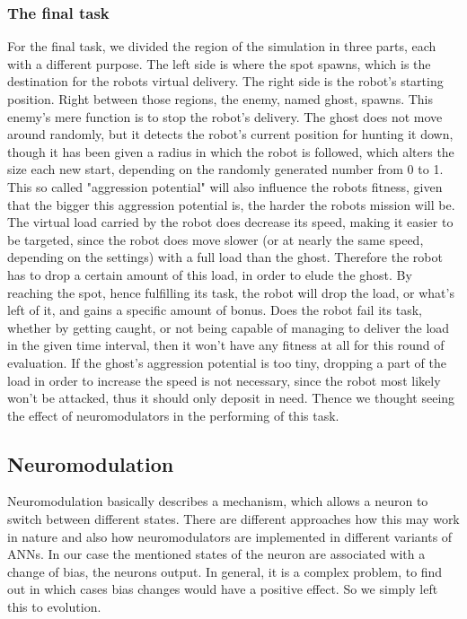 \documentclass[12pt,fleqn,a4paper]{article}
\begin{document}
\subsubsection{The final task}
For the final task, we divided the region of the simulation in three parts, each with a different purpose. The left side is where the spot spawns, which is the destination for the robots virtual delivery. The right side is the robot's 
starting position. Right between those regions, the enemy, named ghost, spawns. This enemy's mere function is to stop the robot's delivery. The ghost does not move around randomly, but it detects the robot's current position for hunting it down, though it has been given a radius in which the robot is followed, which alters the size each new start, depending on the randomly generated number from 0 to 1. This so called "aggression potential" will also influence the robots fitness, given that the bigger this aggression potential is, the harder the robots mission will be. The virtual load carried by the robot does decrease its speed, making it easier to be targeted, since the robot does move slower (or at nearly the same speed, depending on the settings) with a full load than the ghost. Therefore the robot has to drop a certain amount of this load, in order to elude the ghost. By reaching the spot, hence fulfilling its task, the robot will drop the load, or what's left of it, and gains a specific amount of bonus. Does the robot fail its task, whether by getting caught, or not being capable of managing to deliver the load in the given time interval, then it won't have any fitness at all for this round of evaluation. If the ghost's aggression potential is too tiny, dropping a part of the load in order to increase the speed is not necessary, since the robot most likely won't be attacked, thus it should only deposit in need. Thence we thought seeing the effect of neuromodulators in the performing of this task.

\subsection{Neuromodulation}
Neuromodulation basically describes a mechanism, which allows a neuron to switch between different states. There are different approaches how this may work in nature and also how neuromodulators are implemented in different variants of ANNs. In our case the mentioned states of the neuron are associated with a change of bias, the neurons output. In general, it is a complex problem, to find out in which cases bias changes would have a positive effect. So we simply left this to evolution.
\end{document}
